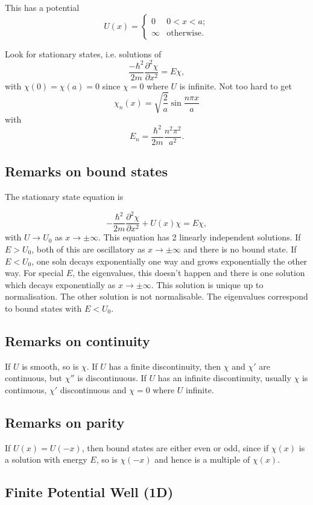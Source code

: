 \documentclass[a4paper]{article}
\newcommand{\pd}[2]{\frac{\partial #1}{\partial #2}}
\begin{document}
This has a potential
\[
U(x)=
\begin{cases}
0       & 0 < x < a; \\
\infty  & \text{otherwise.}
\end{cases}
\]

Look for stationary states, i.e. solutions of
\[
\frac{-\hbar^2}{2m}\pd{^2\chi}{x^2}=E\chi ,
\]
with $\chi(0)=\chi(a)=0$ since $\chi=0$ where $U$ is infinite.  Not too hard to
get
\[
\chi_n(x)=\sqrt{\frac{2}{a}}\sin \frac{n \pi x}{a}
\]
with
\[
E_n = \frac{\hbar^2}{2m}\frac{n^2 \pi^2}{a^2}.
\]

\subsection{Remarks on bound states}

The stationary state equation is

\[
-\frac{\hbar^2}{2m}\pd{^2\chi}{x^2} + U(x)\chi = E\chi,
\]
with $U \rightarrow U_0$ as $x \rightarrow \pm \infty$.  This equation
has 2 linearly independent solutions.  If $E > U_0$, both of this are
oscillatory as $x \rightarrow \pm \infty$ and there is no bound state.
If $E < U_0$, one soln decays exponentially one way and grows exponentially
the other way.  For special $E$, the eigenvalues, this doesn't happen and
there is one solution which decays exponentially as $x \rightarrow \pm \infty$.
This solution is unique up to normalisation.  The other solution is not
normalisable.  The eigenvalues correspond to bound states with $E<U_0$.

\subsection{Remarks on continuity}

If $U$ is smooth, so is $\chi$.  If $U$ has a finite discontinuity, then $\chi$
and $\chi'$ are continuous, but $\chi''$ is discontinuous.  If $U$ has an
infinite discontinuity, usually $\chi$ is continuous, $\chi'$ discontinuous
and $\chi = 0$ where $U$ infinite.

\subsection{Remarks on parity}

If $U(x)=U(-x)$, then bound states are either even or odd, since if $\chi(x)$
is a solution with energy $E$, so is $\chi(-x)$ and hence is a multiple of
$\chi(x)$.

\subsection{Finite Potential Well (1D)}
\end{document}
